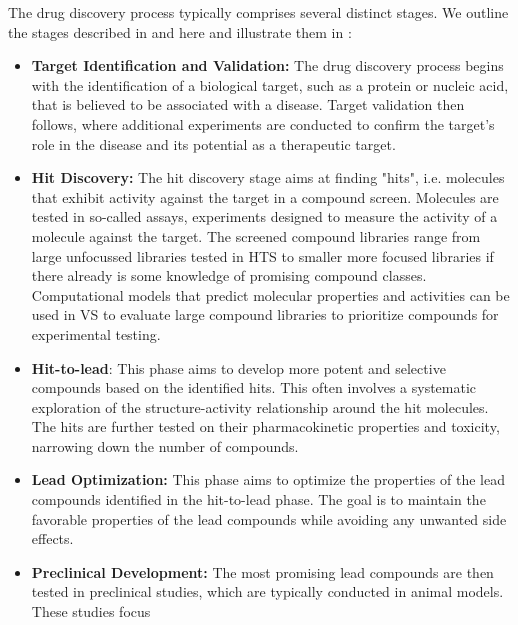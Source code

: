 The drug discovery process typically comprises several distinct stages. We outline the stages
described in \citet{hughesPrinciplesEarlyDrug2011} and \citep{umscheidKeyConceptsClinical2011} here and illustrate them in :
\begin{itemize}
    \item \textbf{Target Identification and Validation:} The drug discovery process begins with the
          identification of a biological target, such as a protein or nucleic acid, that is believed
          to be associated with a disease. Target validation then follows, where additional
          experiments are conducted to confirm the target's role in the disease and its potential as
          a therapeutic target.
    \item \textbf{Hit Discovery:} The hit discovery stage aims at finding "hits", i.e. molecules
          that exhibit activity against the target in a compound screen. Molecules are tested in
          so-called assays, experiments designed to measure the activity of a molecule against the
          target. The screened compound libraries range from large unfocussed libraries tested in
          \ac{HTS} to smaller more focused libraries if there already is some knowledge of promising
          compound classes. Computational models that predict molecular properties and activities
          can be used in \ac{VS}
          \citep{waltersVirtualScreeningOverview1998,shoichetVirtualScreeningChemical2004a} to
          evaluate large compound libraries to prioritize compounds for experimental testing.
    \item \textbf{Hit-to-lead}: This phase aims to develop more potent and selective compounds
          based on the identified hits. This often involves a systematic exploration of the
          structure-activity relationship around the hit molecules.  The hits are further tested on
          their pharmacokinetic properties and toxicity, narrowing down the number of
          compounds.
    \item \textbf{Lead Optimization:} This phase aims to optimize the properties of the
          lead compounds identified in the hit-to-lead phase. The goal is to maintain the favorable
          properties of the lead compounds while avoiding any unwanted side effects.
    \item \textbf{Preclinical Development:} The most promising lead compounds are then tested in
          preclinical studies, which are typically conducted in animal models. These studies focus

\end{itemize}
